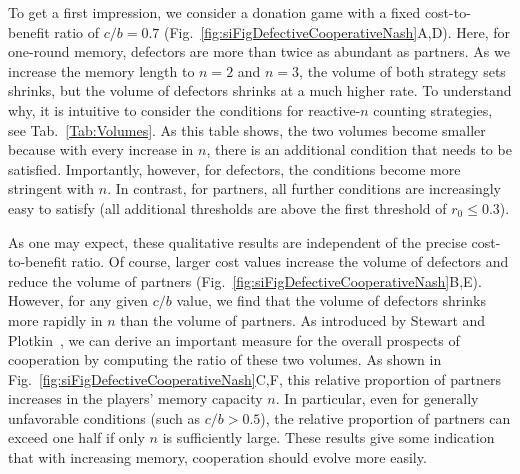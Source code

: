 \documentclass[9pt,twoside,lineno]{pnas-new}
\theoremstyle{plainCl1}
\theoremstyle{plainCl2}
\begin{document}
To get a first impression, we consider a donation game with a fixed cost-to-benefit ratio of $c/b\!=\!0.7$ (Fig.~\ref{fig:siFigDefectiveCooperativeNash}A,D). 
Here, for one-round memory, defectors are more than twice as abundant as partners.
As we increase the memory length to $n\!=\!2$ and $n\!=\!3$, the volume of both strategy sets shrinks, but the volume of defectors shrinks at a much higher rate. 
To understand why, it is intuitive to consider the conditions for reactive-$n$ counting strategies, see Tab.~\ref{Tab:Volumes}. 
As this table shows, the two volumes become smaller because with every increase in $n$, there is an additional condition that needs to be satisfied. 
Importantly, however, for defectors, the conditions become more stringent with $n$. 
In contrast, for partners, all further conditions are increasingly easy to satisfy (all additional thresholds are above the first threshold of $r_0\!\le\!0.3$).  

As one may expect, these qualitative results are independent of the precise cost-to-benefit ratio.
Of course, larger cost values increase the volume of defectors and reduce the volume of partners (Fig.~\ref{fig:siFigDefectiveCooperativeNash}B,E). 
However, for any given $c/b$ value, we find that the volume of defectors shrinks more rapidly in $n$ than the volume of partners. 
As introduced by Stewart and Plotkin~\cite{stewart:scientific:2016}, we can derive an important measure for the overall prospects of cooperation by computing the ratio of these two volumes. 
As shown in Fig.~\ref{fig:siFigDefectiveCooperativeNash}C,F, this relative proportion of partners increases in the players' memory capacity $n$. 
In particular, even for generally unfavorable conditions (such as $c/b\!>\!0.5$), the relative proportion of partners can exceed one half if only $n$ is sufficiently large. 
These results give some indication that with increasing memory, cooperation should evolve more easily. 
\end{document}
